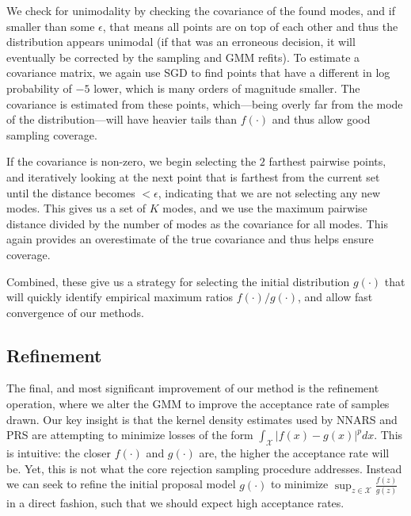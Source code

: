 \documentclass{ecai}  %
\begin{document}
We check for unimodality by checking the covariance of the found modes, and if smaller than some $\epsilon$, that means all points are on top of each other and thus the distribution appears unimodal (if that was an erroneous decision, it will eventually be corrected by the sampling and GMM refits). To estimate a covariance matrix, we again use SGD to find points that have a different in log probability of $-5$ lower, which is many orders of magnitude smaller. The covariance is estimated from these points, which---being overly far from the mode of the distribution---will have heavier tails than $f(\cdot)$ and thus allow good sampling coverage. 

If the covariance is non-zero, we begin selecting the $2$ farthest pairwise points, and iteratively looking at the next point that is farthest from the current set until the distance becomes $< \epsilon$, indicating that we are not selecting any new modes. This gives us a set of $K$ modes, and we use the maximum pairwise distance divided by the number of modes as the covariance for all modes. This again provides an overestimate of the true covariance and thus helps ensure coverage. 

Combined, these give us a strategy for selecting the initial distribution $g(\cdot)$ that will quickly identify empirical maximum ratios $f(\cdot)/g(\cdot)$, and allow fast convergence of our methods. 


\subsection{Refinement} \label{sec:refinement}

The final, and most significant improvement of our method is the refinement operation, where we alter the GMM to improve the acceptance rate of samples drawn. Our key insight is that the kernel density estimates used by NNARS and PRS are attempting to minimize losses of the form $\int_\mathcal{X} \left|f(x) -  g(x)\right|^p dx$. This is intuitive: the closer $f(\cdot)$ and $g(\cdot)$ are, the higher the acceptance rate will be. Yet, this is not what the core rejection sampling procedure addresses. Instead we can seek to refine the initial proposal model $g(\cdot)$ to minimize $\sup_{z \in \mathcal{X}} \frac{f(z)}{g(z)}$ in a direct fashion, such that we should expect high acceptance rates. 
\end{document}
